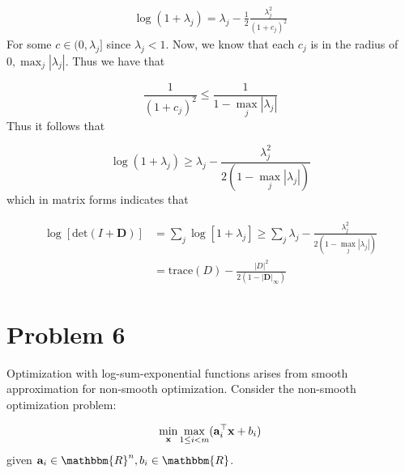 \documentclass{article} %
\newcommand{\R}{\mathbbm{R}}
\newcommand{\B}[1]{\mathbf{#1}}
\renewcommand\a{{\bf a}}
\newcommand\x{{\bf x}}
\renewcommand\a{{\bf a}}
\begin{document}
\begin{equation*}
\begin{aligned}
\log(1 + \lambda_j) = \lambda_j - \frac{1}{2}\frac{\lambda_j^2}{(1 +c_j)^2}
\end{aligned}
\end{equation*}
For some $c \in (0, \lambda_j]$ since $\lambda_j < 1$. Now, we know that each $c_j$ is in the radius of $0, \max_{j} |\lambda_j|$. Thus we have that 

\[
\frac{1}{(1 + c_j)^2} \leq \frac{1}{ 1 - \max_{j} |\lambda_j|}
\]
Thus it follows that 

\[
\log(1 + \lambda_j) \geq \lambda_j - \frac{\lambda_j^2}{ 2( 1 - \max_{j} |\lambda_j| )}
\]
which in matrix forms indicates that 

\begin{equation*}
\begin{aligned}
\log[ \mbox{det}(I + \B{D})] &= \sum_j \log[ 1 + \lambda_j] \geq \sum_{j } \lambda_j - \frac{\lambda_j^2}{ 2( 1 - \max_{j} |\lambda_j| )} \\ 
&= \mbox{trace}(D) - \frac{|D|^2}{2 (1 - |\B{D}|_{\infty})}
\end{aligned}
\end{equation*}
\section*{Problem 6}
Optimization with log-sum-exponential functions arises from smooth approximation
for non-smooth optimization. Consider the non-smooth optimization problem:

\[
\min_{\x} \max_{1\leq i < m} (\a_i^{\top} \x + b_i)
\]
given $\a_i \in \R^{n}, b_i \in \R$. 
\end{document}
